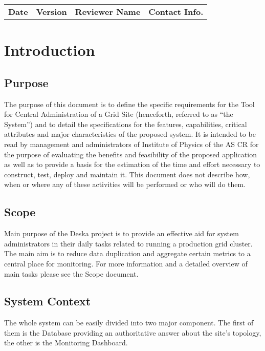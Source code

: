 \documentclass[12pt]{article}
\begin{document}
\begin{table}[!h]
	\begin{tabular}{l l l l}
		\textbf{Date} & \textbf{Version} & \textbf{Reviewer Name} & \textbf{Contact Info.} \\
	\end{tabular}
	\label{tab:DocumentApproval}
\end{table}


\newpage

\tableofcontents

\newpage


\section{Introduction}

\subsection{Purpose}
The purpose of this document is to define the specific requirements for the Tool for Central Administration of a Grid Site 
(henceforth, referred to as ``the System'') and to detail the specifications for the features, capabilities, critical attributes 
and major characteristics of the proposed system. It is intended to be read by management and administrators of Institute of 
Physics of the AS CR for the purpose of evaluating the benefits and feasibility of the proposed application as well as to provide 
a basis for the estimation of the time and effort necessary to construct, test, deploy and maintain it. This document does not 
describe how, when or where any of these activities will be performed or who will do them.

\subsection{Scope}
Main purpose of the Deska project is to provide an effective aid for system
administrators in their daily tasks related to running a production grid
cluster.  The main aim is to reduce data duplication and aggregate certain
metrics to a central place for monitoring.  For more information and a detailed
overview of main tasks please see the Scope document.

\subsection{System Context}
The whole system can be easily divided into two major component.  The first of
them is the Database providing an authoritative answer about the site's
topology, the other is the Monitoring Dashboard.
\end{document}

